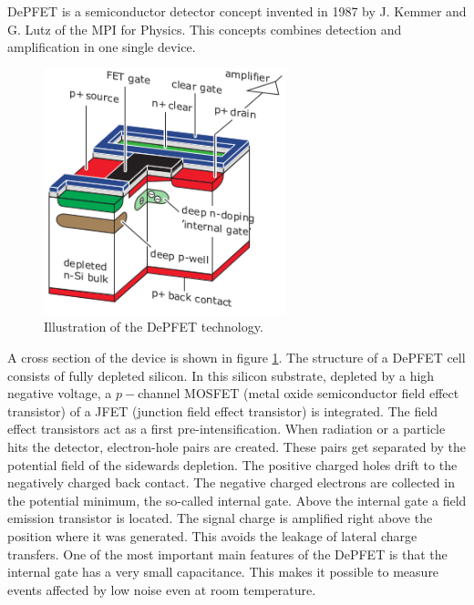 \documentclass[a4paper,11pt,twosided,final,german,openbib,pdftex,listof=totoc,bibliography=totoc]{scrbook}
\begin{document}
DePFET is a semiconductor detector concept invented in 1987 by J. Kemmer and G. Lutz of the MPI for Physics. This concepts combines detection and amplification in one single device. \cite{B2TR}

\begin{figure}[h!]
	\begin{center}
		\includegraphics[width=7cm]{Bilder/DEPFET}
	\end{center}
\caption[DePFET]{Illustration of the DePFET technology.\cite{B2TR}}
\label{fig:DePFET}
\end{figure}

A cross section of the device is shown in figure \ref{fig:DePFET}. The structure of a DePFET cell consists of fully depleted silicon. In this silicon substrate, depleted by a high negative voltage, a $p-$channel MOSFET (metal oxide semiconductor field effect transistor) of a JFET (junction field effect transistor) is integrated. The field effect transistors act as a first pre-intensification. When radiation or a particle hits the detector, electron-hole pairs are created. These pairs get separated by the potential field of the sidewards depletion. The positive charged holes drift to the negatively charged back contact. The negative charged electrons are collected in the potential minimum, the so-called internal gate. Above the internal gate a field emission transistor is located. The signal charge is amplified right above the position where it was generated. This avoids the leakage of lateral charge transfers. One of the most important main features of the DePFET is that the internal gate has a very small capacitance. This makes it possible to measure events affected by low noise even at room temperature.\cite{B2TR}
\end{document}
